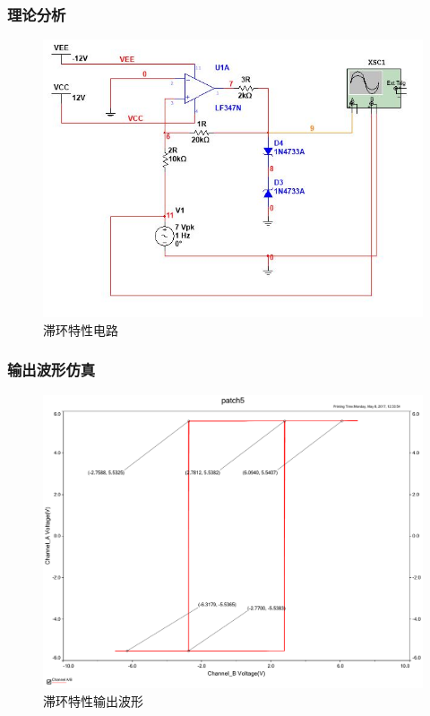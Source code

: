 \documentclass[UTF8,a4paper]{paper}
\begin{document}
\subsubsection{理论分析}
\begin {figure}[H]
\includegraphics [width=\textwidth]{sch.jpg}
\caption{滞环特性电路}
\label{schiCrit}
\end {figure}
\subsubsection{输出波形仿真}
\begin{figure}[H]
\centering
\includegraphics[width=\textwidth]{sch.pdf}
\caption{滞环特性输出波形}
\label{BI}
\end{figure}
\end{document}
